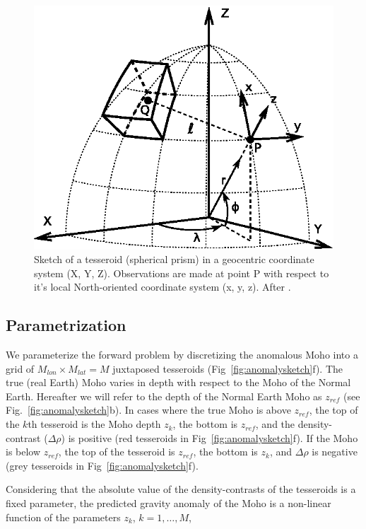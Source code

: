 \documentclass[extra,mreferee]{gji}
\begin{document}
\begin{figure}
    \centering
    \includegraphics{figures/tesseroid-coord-sys}
    \caption{Sketch of a tesseroid (spherical prism) in a geocentric coordinate
        system (X, Y, Z).
        Observations are made at point P with respect to it's local
        North-oriented coordinate system (x, y, z).
        After \citet{uieda2015}.
    }
    \label{fig:tesseroid}
\end{figure}



\subsection{Parametrization}

We parameterize the forward problem by discretizing the anomalous Moho
into a grid of $M_{lon} \times M_{lat} = M$ juxtaposed tesseroids
(Fig~\ref{fig:anomalysketch}f).
The true (real Earth) Moho varies in depth
with respect to the Moho of the Normal Earth.
Hereafter we will refer to the depth of the Normal Earth Moho as $z_{ref}$
(see Fig.~\ref{fig:anomalysketch}b).
In cases where the true Moho is above $z_{ref}$,
the top of the $k$th tesseroid is the Moho depth $z_{k}$,
the bottom is $z_{ref}$, and the density-contrast ($\Delta\rho$) is positive
(red tesseroids in Fig~\ref{fig:anomalysketch}f).
If the Moho is below $z_{ref}$, the top of the tesseroid is $z_{ref}$,
the bottom is $z_k$, and $\Delta\rho$ is negative
(grey tesseroids in Fig~\ref{fig:anomalysketch}f).

Considering that the absolute value of the density-contrasts
of the tesseroids is a fixed parameter,
the predicted gravity anomaly of the Moho is a non-linear function of the
parameters $z_k$, $k=1, \ldots, M$,
\end{document}
